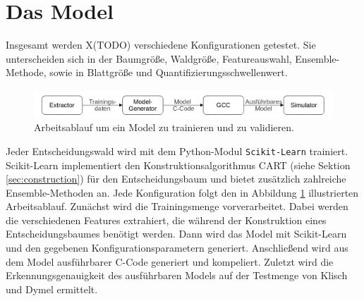 \section{Das Model}
Insgesamt werden X(TODO) verschiedene Konfigurationen getestet. Sie unterscheiden sich in der Baumgröße, Waldgröße, Featureauswahl, Ensemble-Methode, sowie in Blattgröße und Quantifizierungsschwellenwert.
\newline
\begin{figure}
    \centering
    \includegraphics[width=\linewidth]{images/model_workflow.jpg}
    \caption{Arbeitsablauf um ein Model zu trainieren und zu validieren.}
    \label{fig:model_workflow}
\end{figure}
\newline
Jeder Entscheidungswald wird mit dem Python-Modul \texttt{Scikit-Learn} trainiert. Scikit-Learn implementiert den Konstruktionsalgorithmus CART (siehe Sektion \ref{sec:construction}) für den Entscheidungsbaum und bietet
zusätzlich zahlreiche Ensemble-Methoden an. Jede Konfiguration folgt den in Abbildung \ref{fig:model_workflow} illustrierten Arbeitsablauf.
\newline
\newline
Zunächst wird die Trainingsmenge vorverarbeitet. Dabei werden die verschiedenen
Features extrahiert, die während der Konstruktion eines Entscheidungsbaumes benötigt werden. Dann wird das Model mit Scikit-Learn und den gegebenen Konfigurationsparametern generiert. Anschließend wird aus dem Model
ausführbarer C-Code generiert und kompeliert. Zuletzt wird die Erkennungsgenauigkeit des ausführbaren Models auf der Testmenge von Klisch und Dymel ermittelt.

